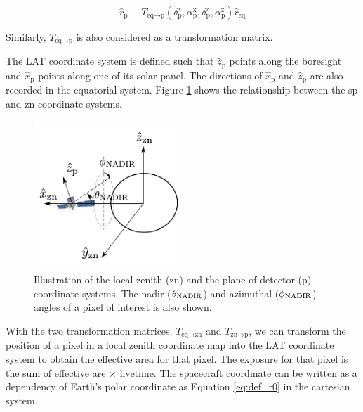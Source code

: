 \begin{equation}
    \hat{r}_\text{p} \equiv T_{\text{eq}\rightarrow\text{p}} (\delta^\text{x}_\text{p}, \alpha^\text{x}_\text{p}, \delta^\text{z}_\text{p}, \alpha^\text{z}_\text{p}) \hat{r}_\text{eq}
    \label{eq:rep_tf_eq_p}
\end{equation}

Similarly, $T_{\text{eq}\rightarrow\text{p}}$ is also considered as 
a transformation matrix.



The LAT coordinate system is defined such that $\hat{z}_\text{p}$
points along the boresight and $\hat{x}_\text{p}$ points
along one of its solar panel.
The directions of $\hat{x}_\text{p}$ and $\hat{z}_\text{p}$
are also recorded in the
equatorial system. Figure \ref{fig:coord_eq_p} shows the
relationship between the sp and zn coordinate systems.

\begin{figure}[h!]
    \centering
    \includegraphics[width=0.5\textwidth]{content/methodology/figures/fig_coordinate/coord_eq_p_v3.pdf}
    \caption{
        Illustration of the local zenith (zn) and the plane of detector
        (p) coordinate systems. The nadir ($\theta_{\rm NADIR}$)
        and azimuthal ($\phi_{\rm NADIR}$) angles of a pixel of
        interest is also shown.
    }
    \label{fig:coord_eq_p}
\end{figure}


With the two transformation matrices,
$T_{\text{eq}\rightarrow\text{zn}}$
and $T_{\text{zn}\rightarrow\text{p}}$,
we can transform the position of a pixel in a local zenith
coordinate map into the LAT coordinate system to obtain
the effective area for that pixel. The exposure for that
pixel is the sum of effective are $\times$ livetime.
The spacecraft coordinate can be 
written as a dependency of Earth's polar coordinate as Equation \ref{eq:def_r0}
in the cartesian system.

